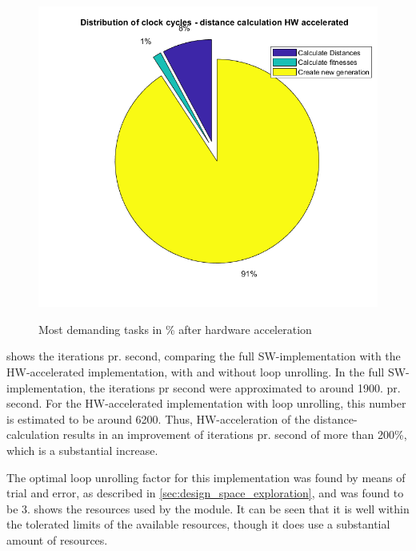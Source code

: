 \begin{figure}[H]
	\centering
	{\includegraphics[width=\textwidth]{Images/cycle_distribution_HW_accelerated.png}}\\[0.5cm]
	\caption{Most demanding tasks in \% after hardware acceleration}
	\label{fig:timing_pie_hw}
\end{figure}

 shows the iterations pr. second, comparing the full SW-implementation with the HW-accelerated implementation, with and without loop unrolling. In the full SW-implementation, the iterations pr second were approximated to around 1900. pr. second. For the HW-accelerated implementation with loop unrolling, this number is estimated to be around 6200. Thus, HW-acceleration of the distance-calculation results in an improvement of iterations pr. second of more than 200\%, which is a substantial increase.

The optimal loop unrolling factor for this implementation was found by means of trial and error, as described in \cref{sec:design_space_exploration}, and was found to be 3.  shows the resources used by the module. It can be seen that it is well within the tolerated limits of the available resources, though it does use a substantial amount of resources.

